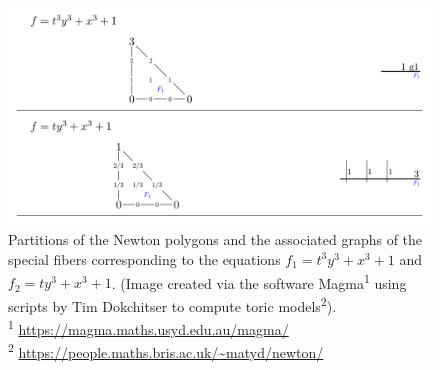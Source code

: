 \begin{example}
\begin{figure} \label{computation}
\includegraphics[width=\textwidth]{examples}
\caption[Caption for example]{Partitions of the Newton polygons and the associated graphs of the special fibers corresponding to the equations $f_1 = t^3 y^3 + x^3 + 1$ and $f_2 = t y^3 + x^3 + 1$. (Image created via the software Magma\textsuperscript{1} using scripts by Tim Dokchitser to compute toric models\textsuperscript{2}).
\\
\small\textsuperscript{1} \url{https://magma.maths.usyd.edu.au/magma/}
\\
\small\textsuperscript{2} \url{https://people.maths.bris.ac.uk/~matyd/newton/}}
\end{figure}
\end{example}

